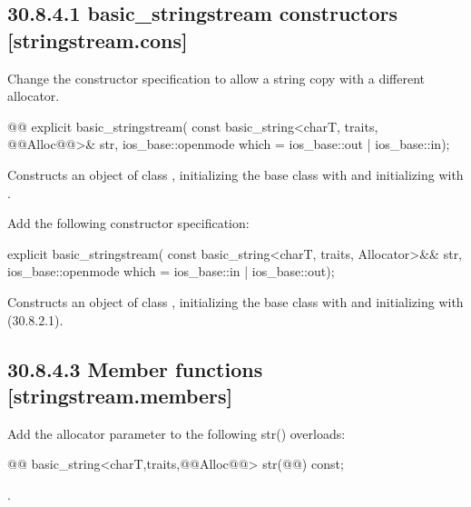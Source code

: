 \documentclass[ebook,11pt,article]{memoir}
\begin{document}
\subsection{30.8.4.1 basic\_stringstream constructors [stringstream.cons]}
Change the constructor specification to allow a string copy with a different allocator.
\begin{itemdecl}
@@
explicit basic_stringstream(
  const basic_string<charT, traits, @@Alloc@@>& str,
  ios_base::openmode which = ios_base::out | ios_base::in);
\end{itemdecl}

\begin{itemdescr}
\pnum
\effects
Constructs an object of class
,
initializing the base class with
and initializing
with
.
\end{itemdescr}

Add the following constructor specification:
\begin{insrt}
\begin{itemdecl}
explicit basic_stringstream(
  const basic_string<charT, traits, Allocator>&& str,
  ios_base::openmode which = ios_base::in | ios_base::out);
\end{itemdecl}
\begin{itemdescr}
\pnum
\effects Constructs an object of class , initializing the base class with  and initializing  with  (30.8.2.1).
\end{itemdescr}
\end{insrt}

\subsection{30.8.4.3 Member functions [stringstream.members]}
Add the allocator parameter to the following str() overloads:
\begin{itemdecl}
@@
basic_string<charT,traits,@@Alloc@@> str(@@) const;
\end{itemdecl}
\begin{itemdescr}
\pnum
\returns
{}.
\end{itemdescr}
\end{document}
